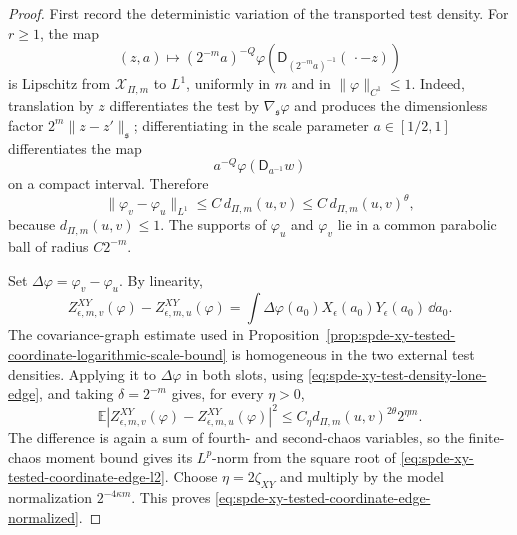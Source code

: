 \begin{proof}
First record the deterministic variation of the transported test density.
For \(r\geq1\), the map
\[
  (z,a)\longmapsto
  (2^{-m}a)^{-Q}\varphi(\mathsf D_{(2^{-m}a)^{-1}}(\,\cdot-z))
\]
is Lipschitz from \(\mathcal X_{\Pi,m}\) to \(L^1\), uniformly in \(m\) and
in \(\|\varphi\|_{C^1}\leq1\).  Indeed, translation by \(z\) differentiates
the test by \(\nabla_{\mathfrak s}\varphi\) and produces the dimensionless
factor \(2^m\|z-z'\|_{\mathfrak s}\); differentiating in the scale
parameter \(a\in[1/2,1]\) differentiates the map
\[
  a^{-Q}\varphi(\mathsf D_{a^{-1}}w)
\]
on a compact interval.  Therefore
\begin{equation}
  \|\varphi_v-\varphi_u\|_{L^1}
  \leq
  C\,d_{\Pi,m}(u,v)
  \leq
  C\,d_{\Pi,m}(u,v)^\theta ,
  \label{eq:spde-xy-test-density-lone-edge}
\end{equation}
because \(d_{\Pi,m}(u,v)\leq1\).  The supports of \(\varphi_u\) and
\(\varphi_v\) lie in a common parabolic ball of radius \(C2^{-m}\).

Set \(\Delta\varphi=\varphi_v-\varphi_u\).  By linearity,
\[
  Z_{\epsilon,m,v}^{XY}(\varphi)-Z_{\epsilon,m,u}^{XY}(\varphi)
  =
  \int\Delta\varphi(a_0)X_\epsilon(a_0)Y_\epsilon(a_0)\,\dd a_0 .
\]
The covariance-graph estimate used in
Proposition~\ref{prop:spde-xy-tested-coordinate-logarithmic-scale-bound} is
homogeneous in the two external test densities.  Applying it to
\(\Delta\varphi\) in both slots, using
\eqref{eq:spde-xy-test-density-lone-edge}, and taking
\(\delta=2^{-m}\) gives, for every \(\eta>0\),
\begin{equation}
  \mathbb E
  \left|
    Z_{\epsilon,m,v}^{XY}(\varphi)-Z_{\epsilon,m,u}^{XY}(\varphi)
  \right|^2
  \leq
  C_\eta
  d_{\Pi,m}(u,v)^{2\theta}
  2^{\eta m}.
  \label{eq:spde-xy-tested-coordinate-edge-l2}
\end{equation}
The difference is again a sum of fourth- and second-chaos variables, so the
finite-chaos moment bound gives its \(L^p\)-norm from the square root of
\eqref{eq:spde-xy-tested-coordinate-edge-l2}.  Choose
\(\eta=2\zeta_{XY}\) and multiply by the model normalization
\(2^{-4\kappa m}\).  This proves
\eqref{eq:spde-xy-tested-coordinate-edge-normalized}.
\end{proof}


